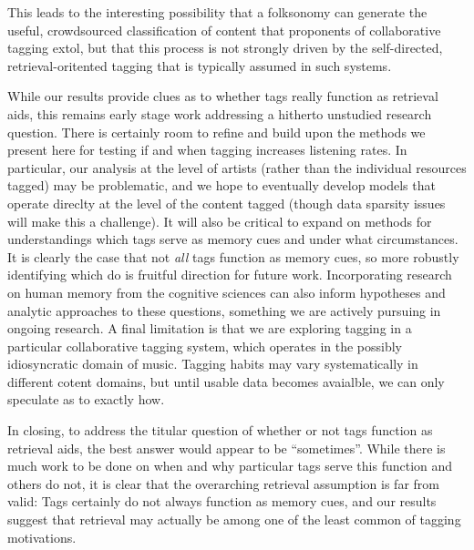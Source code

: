This leads to the interesting possibility that a folksonomy can generate the useful, crowdsourced classification of content that proponents of collaborative tagging extol, but that this process is not strongly driven by the self-directed, retrieval-oritented tagging that is typically assumed in such systems.

While our results provide clues as to whether tags really function as retrieval aids, this remains early stage work addressing a hitherto unstudied research question. There is certainly room to refine and build upon the methods we present here for testing if and when tagging increases listening rates. In particular, our analysis at the level of artists (rather than the individual resources tagged) may be problematic, and we hope to eventually develop models that operate direclty at the level of the content tagged (though data sparsity issues will make this a challenge). It will also be critical to expand on methods for understandings which tags serve as memory cues and under what circumstances. It is clearly the case that not \emph{all} tags function as memory cues, so more robustly identifying which do is fruitful direction for future work. Incorporating research on human memory from the cognitive sciences can also inform hypotheses and analytic approaches to these questions, something we are actively pursuing in ongoing research. A final limitation is that we are exploring tagging in a particular collaborative tagging system, which operates in the possibly idiosyncratic domain of music. Tagging habits may vary systematically in different cotent domains, but until usable data becomes avaialble, we can only speculate as to exactly how.

In closing, to address the titular question of whether or not tags function as retrieval aids, the best answer would appear to be ``sometimes''. While there is much work to be done on when and why particular tags serve this function and others do not, it is clear that the overarching retrieval assumption is far from valid: Tags certainly do not always function as memory cues, and our results suggest that retrieval may actually be among one of the least common of tagging motivations. 

